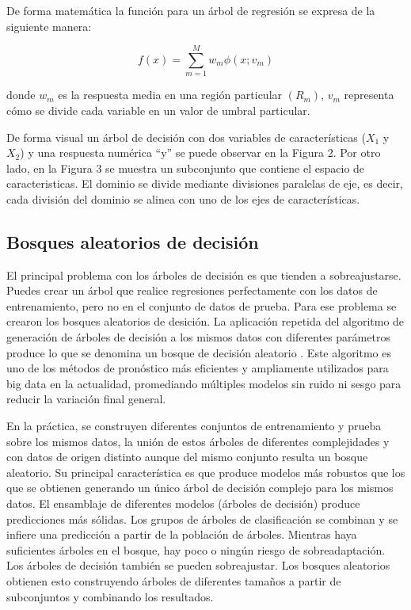 \documentclass[conference]{IEEEtran}
\begin{document}
De forma matemática la función para un árbol de regresión se expresa de la siguiente manera: 

\begin{equation}
f(x)=\sum_{m=1}^{M} w_m\phi(x;v_m)
\end{equation}

donde $w_m$ es la respuesta media en una región particular $(R_m)$, $v_m$ representa cómo se divide cada variable en un valor de umbral particular.

De forma visual un árbol de decisión con dos variables de características ($X_1$ y $X_2$) y una respuesta numérica “y” se puede observar en la Figura 2. Por otro lado, en la Figura 3 se muestra un subconjunto que contiene el espacio de caracteristicas. El dominio se divide mediante divisiones paralelas de eje, es decir, cada división del dominio se alinea con uno de los ejes de características.

\subsection{Bosques aleatorios de decisión}
El principal problema con los árboles de decisión es que tienden a sobreajustarse. Puedes crear un árbol que realice regresiones perfectamente con los datos de entrenamiento, pero no en el conjunto de datos de prueba. Para ese problema se crearon los bosques aleatorios de desición. La aplicación repetida del algoritmo de generación de árboles de decisión a los mismos datos con diferentes parámetros produce lo que se denomina un bosque de decisión aleatorio \cite{b4}. Este algoritmo es uno de los métodos de pronóstico más eficientes y ampliamente utilizados para big data en la actualidad, promediando múltiples modelos sin ruido ni sesgo para reducir la variación final general. 

En la práctica, se construyen diferentes conjuntos de entrenamiento y prueba sobre los mismos datos, la unión de estos árboles de diferentes complejidades y con datos de origen distinto aunque del mismo conjunto resulta un bosque aleatorio. Su principal característica es que produce modelos más robustos que los que se obtienen generando un único árbol de decisión complejo para los mismos datos. El ensamblaje de diferentes modelos (árboles de decisión) produce predicciones más sólidas. Los grupos de árboles de clasificación se combinan y se infiere una predicción a partir de la población de árboles. Mientras haya suficientes árboles en el bosque, hay poco o ningún riesgo de sobreadaptación. Los árboles de decisión también se pueden sobreajustar. Los bosques aleatorios obtienen esto construyendo árboles de diferentes tamaños a partir de subconjuntos y combinando los resultados.
\end{document}
